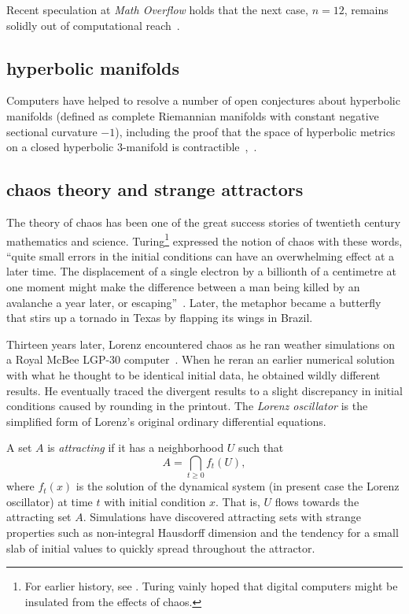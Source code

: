 \documentclass{llncs}
\begin{document}
Recent speculation at {\it Math Overflow} holds that the next case,
$n=12$, remains solidly out of computational reach~\cite{Horn}.



\subsection{hyperbolic manifolds}

Computers have helped to resolve a number of open conjectures about
hyperbolic manifolds (defined as complete Riemannian manifolds with
constant negative sectional curvature $-1$), including the proof that
the space of hyperbolic metrics on a closed hyperbolic $3$-manifold is
contractible~\cite{GMT},~\cite{GabICM}.


\subsection{chaos theory and strange attractors}

The theory of chaos has been one of the great success stories of
twentieth century mathematics and science.   Turing\footnote{For
  earlier history, see \cite[p.~971]{Wolfram:NKS}. Turing vainly hoped that
  digital computers might be insulated from the effects of chaos.}
expressed the notion of chaos with these words, ``quite small errors
in the initial conditions can have an overwhelming effect at a later
time.  The displacement of a single electron by a billionth of a
centimetre at one moment might make the difference between a man being
killed by an avalanche a year later, or escaping''~\cite{Tu50}.
Later, the metaphor became a butterfly
that stirs up a tornado in Texas by flapping its wings in Brazil.

Thirteen years later, Lorenz encountered chaos as he ran weather
simulations on a Royal McBee LGP-30 computer~\cite{Lo63}.  When he
reran an earlier numerical solution with what he thought to be
identical initial data, he obtained wildly different results.  He
eventually traced the divergent results to a slight discrepancy in
initial conditions caused by rounding in the printout.  The {\it Lorenz
  oscillator} is the simplified form of Lorenz's original ordinary
differential equations.

A set $A$ is {\it attracting} if it has a neighborhood $U$ such
that
\[
A = \bigcap_{t\ge 0} f_t(U),
\]
where $f_t(x)$ is the solution of the dynamical system (in present
case the Lorenz oscillator) at time $t$ with initial condition
$x$. That is, $U$ flows towards the attracting set $A$.  Simulations
have discovered attracting sets with strange properties such as
non-integral Hausdorff dimension and the tendency for a small slab of
initial values to quickly spread throughout the attractor.
\end{document}
